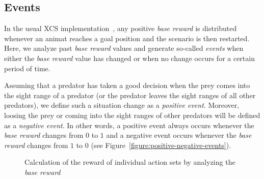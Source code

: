 
\subsection{Events}
\label{subsection:events}

In the usual XCS implementation~\cite{BW02}, any positive \emph{base reward} is distributed whenever an animat reaches a goal position and the scenario is then restarted. Here, we analyze past \emph{base reward} values and generate so-called \emph{events} when either the \emph{base reward} value has changed or when no change occurs for a certain period of time.

Assuming that a predator has taken a good decision when the prey comes into the sight range of a predator (or the predator leaves the sight ranges of all other predators), we define such a situation change as a \emph{positive event}. Moreover, loosing the prey or coming into the sight ranges of other predators will be defined as a \emph{negative event}. In other words, a positive event always occurs whenever the \emph{base reward} changes from $0$ to $1$ and a negative event occurs whenever the \emph{base reward} changes from $1$ to $0$ (see Figure~\ref{figure:positive-negative-events}).

\begin{figure*}[ht]
  \hfill
  \hfill
	\caption{Calculation of the reward of individual action sets by analyzing the \emph{base reward}}
	\label{figure:experiment}
\end{figure*}


